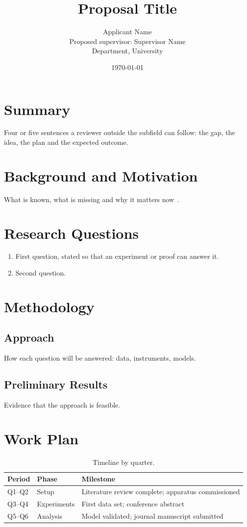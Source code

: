 \documentclass[11pt,a4paper]{article}
\title{Proposal Title}
\author{Applicant Name \\ Proposed supervisor: Supervisor Name \\ Department, University}
\date{\today}
\begin{document}
\maketitle

\section*{Summary}
Four or five sentences a reviewer outside the subfield can follow: the gap,
the idea, the plan and the expected outcome.

\section{Background and Motivation}
What is known, what is missing and why it matters now~\cite{lamport1994}.

\section{Research Questions}
\begin{enumerate}[label=\textbf{Q\arabic*.}]
  \item First question, stated so that an experiment or proof can answer it.
  \item Second question.
\end{enumerate}

\section{Methodology}
\subsection{Approach}
How each question will be answered: data, instruments, models.

\subsection{Preliminary Results}
Evidence that the approach is feasible.

\section{Work Plan}

\begin{table}[htbp]
  \centering
  \caption{Timeline by quarter.}
  \begin{tabular}{llp{7.5cm}}
    \toprule
    Period & Phase & Milestone \\
    \midrule
    Q1--Q2 & Setup       & Literature review complete; apparatus commissioned \\
    Q3--Q4 & Experiments & First data set; conference abstract \\
    Q5--Q6 & Analysis    & Model validated; journal manuscript submitted \\
    \bottomrule
  \end{tabular}
\end{table}
\end{document}
